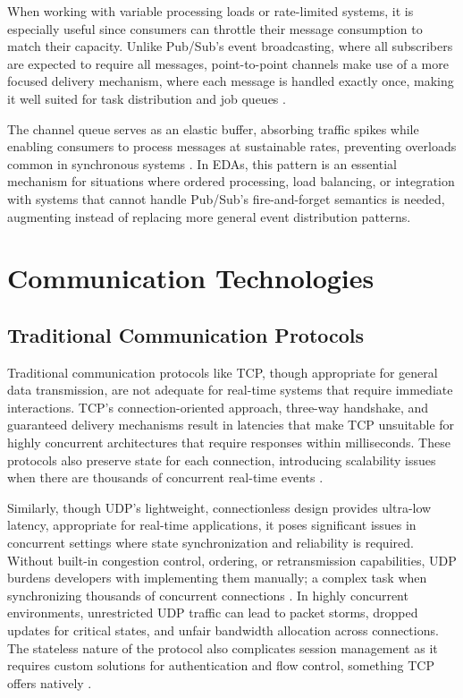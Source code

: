 \documentclass[]{final}
\begin{document}
When working with variable processing loads or rate-limited systems, it is
especially useful since consumers can throttle their message consumption to
match their capacity. Unlike Pub/Sub's event broadcasting, where all
subscribers are expected to require all messages, point-to-point channels
make use of a more focused delivery mechanism, where each message is
handled exactly once, making it well suited for task distribution and
job queues \cite{noauthor_point--point_nodate}.

The channel queue serves as an elastic buffer, absorbing traffic spikes while
enabling consumers to process messages at sustainable rates, preventing
overloads common in synchronous systems \cite{noauthor_point--point_nodate}. In EDAs, this pattern is an
essential mechanism for situations where ordered processing, load balancing,
or integration with systems that cannot handle Pub/Sub's fire-and-forget
semantics is needed, augmenting instead of replacing more general event
distribution patterns.

\newpage

\section{Communication Technologies}

\subsection{Traditional Communication Protocols}

Traditional communication protocols like TCP, though appropriate for general
data transmission, are not adequate for real-time systems that require immediate
interactions. TCP's connection-oriented approach, three-way handshake, and
guaranteed delivery mechanisms result in latencies that make TCP unsuitable
for highly concurrent architectures that require responses within milliseconds.
These protocols also preserve state for each connection, introducing
scalability issues when there are thousands of concurrent real-time events \cite{kumar_survey_2012}.

Similarly, though UDP's lightweight, connectionless design provides ultra-low
latency, appropriate for real-time applications, it poses significant issues in
concurrent settings where state synchronization and reliability is required.
Without built-in congestion control, ordering, or retransmission capabilities,
UDP burdens developers with implementing them manually; a complex task when
synchronizing thousands of concurrent connections \cite{kumar_survey_2012}. In highly concurrent
environments, unrestricted UDP traffic can lead to packet storms, dropped
updates for critical states, and unfair bandwidth allocation across
connections. The stateless nature of the protocol also complicates session
management as it requires custom solutions for authentication and flow control,
something TCP offers natively \cite{kumar_survey_2012}.
\end{document}
